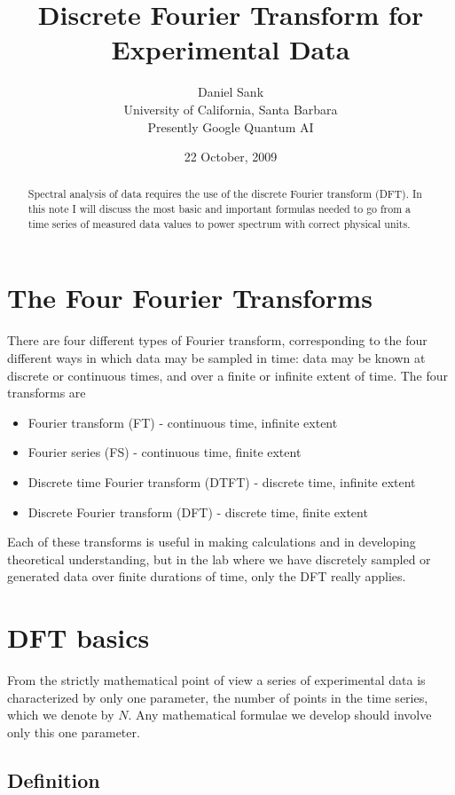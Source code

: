 \documentclass[twocolumn]{article}
\title{Discrete Fourier Transform for Experimental Data}
\author{Daniel Sank\\\small{University of California, Santa Barbara}\\\small{Presently Google Quantum AI}}
\date{22 October, 2009}
\begin{document}
\maketitle

\begin{abstract}
Spectral analysis of data requires the use of the discrete Fourier
transform (DFT). In this note I will discuss the most basic and important
formulas needed to go from a time series of measured data values to
power spectrum with correct physical units. 
\end{abstract}


\section{The Four Fourier Transforms}

There are four different types of Fourier transform, corresponding
to the four different ways in which data may be sampled in time: data
may be known at discrete or continuous times, and over a finite or
infinite extent of time. The four transforms are 
\begin{itemize}
\item Fourier transform (FT) - continuous time, infinite extent 
\item Fourier series (FS) - continuous time, finite extent 
\item Discrete time Fourier transform (DTFT) - discrete time, infinite extent 
\item Discrete Fourier transform (DFT) - discrete time, finite extent 
\end{itemize}
Each of these transforms is useful in making calculations and in developing theoretical understanding, but in the lab where we have discretely sampled or generated data over finite durations of time, only the DFT really applies.


\section{DFT basics}

From the strictly mathematical point of view a series of experimental data is characterized by only one parameter, the number of points in the time series, which we denote by $N$.
Any mathematical formulae we develop should involve only this one parameter.

\subsection{Definition}
\end{document}
